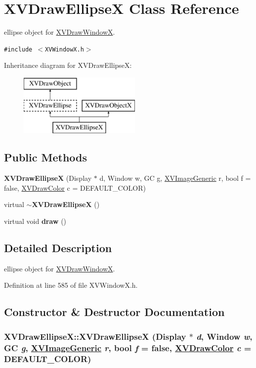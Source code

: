\hypertarget{class_XVDrawEllipseX}{
\section{XVDraw\-Ellipse\-X  Class Reference}
\label{XVDrawEllipseX}
}
ellipse object for \hyperlink{class_XVDrawWindowX}{XVDraw\-Window\-X}. 


{\tt \#include $<$XVWindow\-X.h$>$}

Inheritance diagram for XVDraw\-Ellipse\-X:\begin{figure}[H]
\begin{center}
\leavevmode
\includegraphics[height=3cm]{class_XVDrawEllipseX}
\end{center}
\end{figure}
\subsection*{Public Methods}
\begin{CompactItemize}
\item 
{\bf XVDraw\-Ellipse\-X} (Display $\ast$ d, Window w, GC g, \hyperlink{class_XVImageGeneric}{XVImage\-Generic} r, bool f = false, \hyperlink{class_XVDrawColor}{XVDraw\-Color} c = DEFAULT\_\-COLOR)
\item 
virtual {\bf $\sim$XVDraw\-Ellipse\-X} ()
\item 
virtual void {\bf draw} ()
\end{CompactItemize}


\subsection{Detailed Description}
ellipse object for \hyperlink{class_XVDrawWindowX}{XVDraw\-Window\-X}.





Definition at line 585 of file XVWindow\-X.h.

\subsection{Constructor \& Destructor Documentation}
\label{XVDrawEllipseX_a0}
\hypertarget{class_XVDrawEllipseX_a0}{
\subsubsection[XVDrawEllipseX]{\setlength{\rightskip}{0pt plus 5cm}XVDraw\-Ellipse\-X::XVDraw\-Ellipse\-X (Display $\ast$ {\em d}, Window {\em w}, GC {\em g}, \hyperlink{class_XVImageGeneric}{XVImage\-Generic} {\em r}, bool {\em f} = false, \hyperlink{class_XVDrawColor}{XVDraw\-Color} {\em c} = DEFAULT\_\-COLOR)}}




